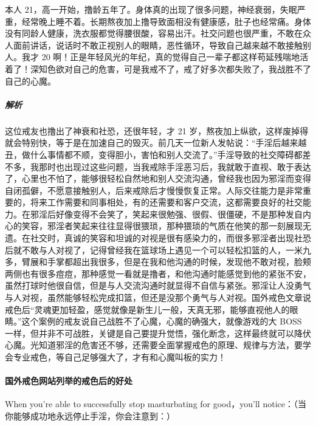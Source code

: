 \begin{case}
    本人 21，高一开始，撸龄五年了。身体真的出现了很多问题，神经衰弱，失眠严重，经常晚上睡不着。长期熬夜加上撸导致面相没有健康感，肚子也经常痛。身体没有同龄人健康，洗衣服都觉得腰很酸，容易出汗。社交问题也很严重，不敢在众人面前讲话，说话时不敢正视别人的眼睛，恶性循环，导致自己越来越不敢接触别人。我才 20 啊！正是年轻风光的年纪，真的觉得自己一辈子都这样苟延残喘地活着了！深知色欲对自己的危害，可是我戒不了，戒了好多次都失败了，我战胜不了自己的心魔。
    \subparagraph{解析} 这位戒友也撸出了神衰和社恐，还很年轻，才 21 岁，熬夜加上纵欲，这样废掉得就会特别快，等于是在加速自己的毁灭。前几天一位新人发帖说：“手淫后越来越丑，做什么事情都不顺，变得胆小，害怕和别人交流了。”手淫导致的社交障碍都差不多，我那时也出现过这些问题，当我戒除手淫恶习后，我就敢于直视、敢于表达了，心里也不怕了，能够很轻松自然地和别人交流沟通，曾经我也因为邪淫而变得自闭孤僻，不愿意接触别人，后来戒除后才慢慢恢复正常。人际交往能力是非常重要的，将来工作需要和同事相处，有的还需要和客户交流，这都需要良好的社交能力。在邪淫后好像变得不会笑了，笑起来很勉强、很假、很僵硬，不是那种发自内心的笑容，邪淫者笑起来往往显得很猥琐，那种猥琐的气质在他笑的那一刻展现无遗。在社交时，真诚的笑容和坦诚的对视是很有感染力的，而很多邪淫者出现社恐后就不敢与人对视了，记得曾经我在篮球场上遇见一个可以轻松扣篮的人，一米九多，臂展和手掌都超出我很多，但是在我和他沟通的时候，发现他不敢对视，脸颊两侧也有很多痘痘，那种感觉一看就是撸者，和他沟通时能感觉到他的紧张不安，虽然打球时他很自信，但是与人交流沟通时就显得不自信与紧张。邪淫让人没勇气与人对视，虽然能够轻松完成扣篮，但还是没那个勇气与人对视。国外戒色文章说戒色后“灵魂更加轻盈，感觉就像是新生儿一般，天真无邪，能够直视他人的眼睛。”这个案例的戒友说自己战胜不了心魔，心魔的确强大，就像游戏的大 BOSS 一样，但并非不可战胜，关键是自己要提升觉悟，强化断念，这样最终就可以降伏心魔。光知道邪淫的危害还不够，还需要全面掌握戒色的原理、规律与方法，要学会专业戒色，等自己足够强大了，才有和心魔叫板的实力！
\end{case}

\paragraph{国外戒色网站列举的戒色后的好处}

When you're able to successfully stop masturbating for good，you'll notice：（当你能够成功地永远停止手淫，你会注意到：）

